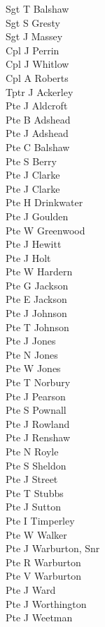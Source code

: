 \begin{multicols}{3}
  Sgt T Balshaw \\
  Sgt S Gresty \\
  Sgt J Massey \\
  Cpl J Perrin \\
  Cpl J Whitlow \\
  Cpl A Roberts \\
  Tptr J Ackerley \\
  Pte J Aldcroft \\
  Pte B Adshead \\
  Pte J Adshead \\
  Pte C Balshaw \\
  Pte S Berry \\
  Pte J Clarke \\
  Pte J Clarke \\
  Pte H Drinkwater \\
  Pte J Goulden \\
  Pte W Greenwood \\
  Pte J Hewitt \\
  Pte J Holt \\
  Pte W Hardern \\
  Pte G Jackson \\
  Pte E Jackson \\
  Pte J Johnson \\
  Pte T Johnson \\
  Pte J Jones \\
  Pte N Jones \\
  Pte W Jones \\
  Pte T Norbury \\
  Pte J Pearson \\
  Pte S Pownall \\
  Pte J Rowland \\
  Pte J Renshaw \\
  Pte N Royle \\
  Pte S Sheldon \\
  Pte J Street \\
  Pte T Stubbs \\
  Pte J Sutton \\
  Pte I Timperley \\
  Pte W Walker \\
  Pte J Warburton, Snr \\
  Pte R Warburton \\
  Pte V Warburton \\
  Pte J Ward \\
  Pte J Worthington \\
  Pte J Weetman \\
\end{multicols}

